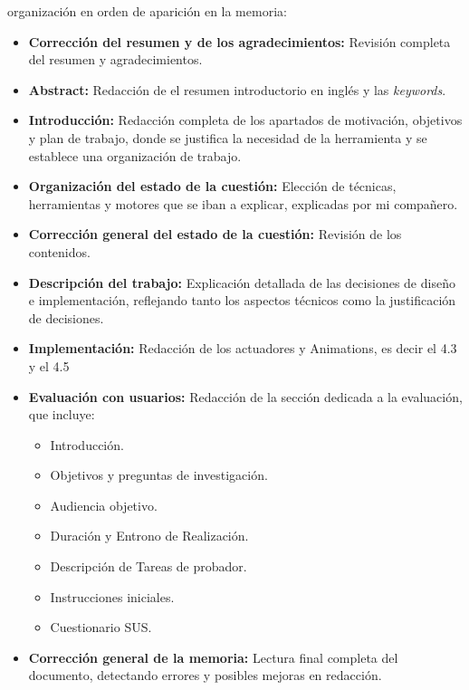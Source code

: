 organización en orden de aparición en la memoria:
\begin{itemize}
  \item \textbf{Corrección del resumen y de los agradecimientos:} Revisión completa del resumen y agradecimientos.
  \item \textbf{Abstract:} Redacción de el resumen introductorio en inglés y las \textit{keywords}.
  \item \textbf{Introducción:} Redacción completa de los apartados de motivación, objetivos y plan de trabajo, donde se justifica la necesidad de la herramienta y se establece una organización de trabajo.
  \item \textbf{Organización del estado de la cuestión:} Elección de técnicas, herramientas y motores que se iban a explicar, explicadas por mi compañero.
  \item \textbf{Corrección general del estado de la cuestión:} Revisión de los contenidos.
  \item \textbf{Descripción del trabajo:} Explicación detallada de las decisiones de diseño e implementación, reflejando tanto los aspectos técnicos como la justificación de decisiones.
  \item \textbf{Implementación:} Redacción de los actuadores y Animations, es decir el 4.3 y el 4.5
  \item \textbf{Evaluación con usuarios:} Redacción de la sección dedicada a la evaluación, que incluye:
  \begin{itemize}
    \item Introducción.
    \item Objetivos y preguntas de investigación.
    \item Audiencia objetivo.
    \item Duración y Entrono de Realización.
    \item Descripción de Tareas de probador.
    \item Instrucciones iniciales.
    \item Cuestionario SUS.
  \end{itemize}

  \item \textbf{Corrección general de la memoria:} Lectura final completa del documento, detectando errores  y posibles mejoras en redacción.

\end{itemize}

